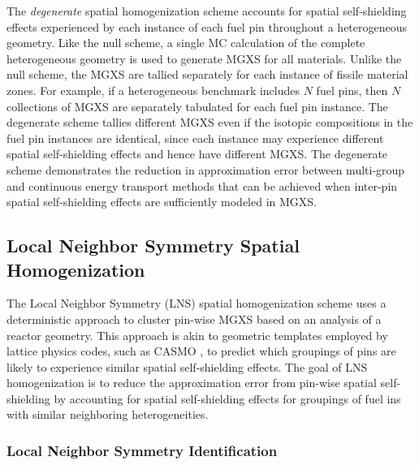 The \textit{degenerate} spatial homogenization scheme accounts for spatial self-shielding effects experienced by each instance of each fuel pin throughout a heterogeneous geometry. Like the null scheme, a single MC calculation of the complete heterogeneous geometry is used to generate MGXS for all materials. Unlike the null scheme, the MGXS are tallied separately for each instance of fissile material zones. For example, if a heterogeneous benchmark includes $N$ fuel pins, then $N$ collections of MGXS are separately tabulated for each fuel pin instance. The degenerate scheme tallies different MGXS even if the isotopic compositions in the fuel pin instances are identical, since each instance may experience different spatial self-shielding effects and hence have different MGXS. The degenerate scheme demonstrates the reduction in approximation error between multi-group and continuous energy transport methods that can be achieved when inter-pin spatial self-shielding effects are sufficiently modeled in MGXS.

\subsection{Local Neighbor Symmetry Spatial Homogenization}
\label{subsec:homogenize-lns}

The Local Neighbor Symmetry (LNS) spatial homogenization scheme uses a deterministic approach to cluster pin-wise MGXS based on an analysis of a reactor geometry. This approach is akin to geometric templates employed by lattice physics codes, such as CASMO \citep{edenius1995casmo}, to predict which groupings of pins are likely to experience similar spatial self-shielding effects. The goal of LNS homogenization is to reduce the approximation error from pin-wise spatial self-shielding by accounting for spatial self-shielding effects for groupings of fuel ins with similar neighboring heterogeneities.



\subsubsection{Local Neighbor Symmetry Identification}
\label{subsubsec:homogenize-lns}

